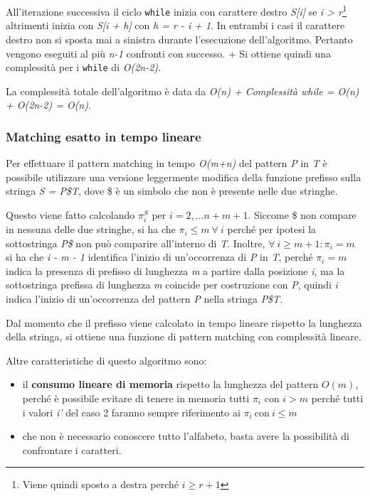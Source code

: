 All'iterazione successiva il ciclo \texttt{while} inizia con carattere destro \textit{S[i]} se \textit{i > r}\footnote{Viene quindi sposto a destra perché $ i \geq r+1 $} altrimenti inizia con \textit{S[i + h]} con \textit{h = r - i + 1}. In entrambi i casi il carattere destro non si sposta mai a sinistra durante l'esecuzione dell'algoritmo. 
Pertanto vengono eseguiti al più \emph{n-1} confronti con successo. +
Si ottiene quindi una complessità per i \texttt{while} di \emph{O(2n-2)}.

La complessità totale dell'algoritmo è data da \emph{O(n) + Complessità while = O(n) + O(2n-2) = O(n)}.

\subsubsection{Matching esatto in tempo lineare}\label{matching-esatto-in-tempo-lineare}

Per effettuare il pattern matching in tempo \emph{O(m+n)} del pattern \emph{P} in \emph{T} è possibile utilizzare una versione leggermente modifica della funzione prefisso sulla stringa \emph{S = P\$T}, dove \$ è un simbolo che non è presente nelle due stringhe.

Questo viene fatto calcolando $ \pi_i^S $ per $ i = 2, \ldots n + m +1 $.
Siccome \$ non compare in nessuna delle due stringhe, si ha che $ \pi_i \leq m \: \forall \: i $ perché per ipotesi la sottostringa \textit{P\$} non può comparire all'interno di \textit{T}.
Inoltre, $ \forall \: i \geq m +1 : \pi_i = m $ si ha che \textit{i - m - 1} identifica l'inizio di un'occorrenza di \textit{P} in \textit{T}, perché $ \pi_i = m $ indica la presenza di prefisso di lunghezza \textit{m} a partire dalla posizione \textit{i}, ma la sottostringa prefissa di lunghezza \textit{m} coincide per costruzione con \textit{P}, quindi \textit{i} indica l'inizio di un'occorrenza del pattern \textit{P} nella stringa \textit{P\$T}.

Dal momento che il prefisso viene calcolato in tempo lineare rispetto la lunghezza della stringa, si ottiene una funzione di pattern matching con complessità lineare.

Altre caratteristiche di questo algoritmo sono:
\begin{itemize}
	\item il \textbf{consumo lineare di memoria} rispetto la lunghezza del pattern $ O(m) $, perché è possibile evitare di tenere in memoria tutti $ \pi_i $ con $ i >m $ perché tutti i valori \textit{i'} del caso 2 faranno sempre riferimento ai $ \pi_i \: \text{con}\: i \leq m $
	\item che non è necessario conoscere tutto l'alfabeto, basta avere la possibilità di confrontare i caratteri.
\end{itemize}

